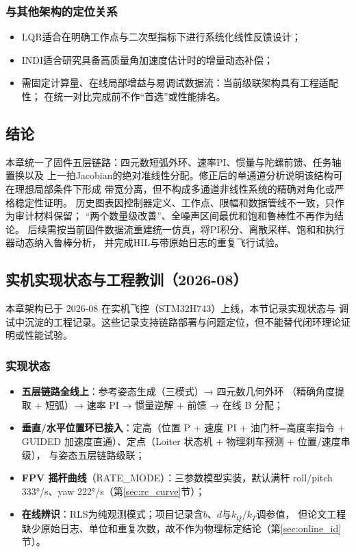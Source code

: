 \subsubsection{与其他架构的定位关系}

\begin{itemize}
    \item LQR适合在明确工作点与二次型指标下进行系统化线性反馈设计；
    \item INDI适合研究具备高质量角加速度估计时的增量动态补偿；
    \item 需固定计算量、在线局部增益与易调试数据流：当前级联架构具有工程适配性；
          在统一对比完成前不作“首选”或性能排名。
\end{itemize}

\subsection{结论}
\label{sec:cascade_conclusion}

本章统一了固件五层链路：四元数短弧外环、速率PI、惯量与陀螺前馈、任务轴置换以及
上一拍Jacobian的绝对准线性分配。修正后的单通道分析说明该结构可在理想局部条件下形成
带宽分离，但不构成多通道非线性系统的精确对角化或严格稳定性证明。
历史图表因控制器定义、工作点、限幅和数据管线不一致，只作为审计材料保留；
“两个数量级改善”、全噪声区间最优和饱和鲁棒性不再作为结论。
后续需按当前固件数据流重建统一仿真，将PI积分、离散采样、饱和和执行器动态纳入鲁棒分析，
并完成HIL与带原始日志的重复飞行试验。

\subsection{实机实现状态与工程教训（2026-08）}
\label{sec:cascade_implementation}

本章架构已于 2026-08 在实机飞控（STM32H743）上线，本节记录实现状态与
调试中沉淀的工程记录。这些记录支持链路部署与问题定位，但不能替代闭环理论证明或性能试验。

\subsubsection{实现状态}

\begin{itemize}
    \item \textbf{五层链路全线上}：参考姿态生成（三模式）→ 四元数几何外环
          （精确角度提取 + 短弧）→ 速率 PI → 惯量逆解 + 前馈 → 在线 B 分配；
    \item \textbf{垂直/水平位置环已接入}：定高（位置 P + 速度 PI + 油门杆=高度率指令 +
          GUIDED 加速度直通）、定点（Loiter 状态机 + 物理刹车预测 + 位置/速度串级），
          与姿态五层链路级联；
    \item \textbf{FPV 摇杆曲线}（RATE\_MODE）：三参数模型实装，默认满杆
          roll/pitch 333°/s、yaw 222°/s（第\ref{sec:rc_curve}节）；
    \item \textbf{在线辨识}：RLS为纯观测模式；项目记录含$b$、$d$与$k_Q/k_T$调参值，
          但论文工程缺少原始日志、单位和重复次数，故不作为物理标定结论（第\ref{sec:online_id}节）。
\end{itemize}

